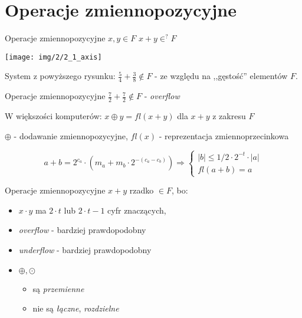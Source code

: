 \section{Operacje zmiennopozycyjne}
\begin{frame}{Operacje zmiennopozycyjne}
    $x, y \in F$ \newline
    $x + y \in^? F$

    \begin{center}
    \texttt{[image: img/2/2\_1\_axis]}
    \end{center}
    System z powyższego rysunku: $\frac{5}{4} + \frac{3}{8} \notin F$ - ze względu na ,,gęstość'' elementów $F$.
\end{frame}
\begin{frame}{Operacje zmiennopozycyjne}
    $\frac{7}{2} + \frac{7}{2} \notin F$ - {\it overflow}
    \vspace{.5cm}

    W większości komputerów: $x \oplus y = fl(x + y)$ dla $x + y$ z zakresu $F$

    $\oplus$ - dodawanie zmiennopozycyjne, \newline
    $fl(x)$ - reprezentacja zmiennoprzecinkowa 

    \[
    a + b = 2^{c_a} \cdot \left( m_a + m_b \cdot 2^{-(c_a-c_b)} \right) \Rightarrow
    \left\{ 
        \begin{array}{ll}
            |b| \le 1/2 \cdot 2^{-t} \cdot |a| \\
            fl(a + b) = a
        \end{array}
    \right.
    \]
\end{frame}
\begin{frame}{Operacje zmiennopozycyjne}
    $x + y$ rzadko $\in F$, bo:
    \begin{itemize}
    \item $x \cdot y$ ma $2 \cdot t$ lub $2 \cdot t - 1$ cyfr znaczących,
    \item {\it overflow} - bardziej prawdopodobny
    \item {\it underflow} - bardziej prawdopodobny
    \item $\oplus, \odot$
        \begin{itemize}
        \item są {\it przemienne}
        \item nie są {\it łączne}, {\it rozdzielne}
        \end{itemize}
    \end{itemize}
\end{frame}
